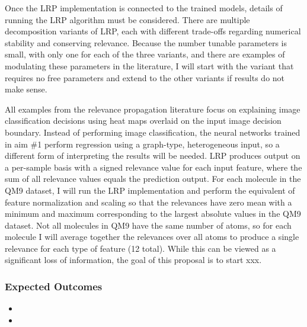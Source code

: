 \documentclass[12pt]{article}
\begin{document}
Once the LRP implementation is connected to the trained models, details of running the LRP algorithm must be considered. There are multiple decomposition variants of LRP, each with different trade-offs regarding numerical stability and conserving relevance\cite{Binder2016}. Because the number tunable parameters is small, with only one for each of the three variants, and there are examples of modulating these parameters in the literature, I will start with the variant that requires no free parameters and extend to the other variants if results do not make sense.

All examples from the relevance propagation literature focus on explaining image classification decisions using heat maps overlaid on the input image decision boundary. Instead of performing image classification, the neural networks trained in aim \#1 perform regression using a graph-type, heterogeneous input, so a different form of interpreting the results will be needed. LRP produces output on a per-sample basis with a signed relevance value for each input feature, where the sum of all relevance values equals the prediction output. For each molecule in the QM9 dataset, I will run the LRP implementation and perform the equivalent of feature normalization and scaling so that the relevances have zero mean with a minimum and maximum corresponding to the largest absolute values in the QM9 dataset. Not all molecules in QM9 have the same number of atoms, so for each molecule I will average together the relevances over all atoms to produce a single relevance for each type of feature (12 total). While this can be viewed as a significant loss of information, the goal of this proposal is to start xxx.


\subsubsection{Expected Outcomes}
\label{sec:org72df74d}

\begin{itemize}
\item {}
\item {}
\end{itemize}
\end{document}
